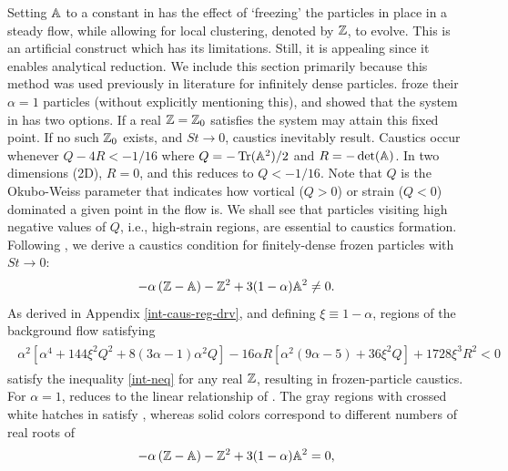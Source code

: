 \documentclass[../Rajarshi-thesis-draft.tex]{subfiles}
\begin{document}
Setting $\mathbb{A}$ to a constant in  has the effect of `freezing' the particles in place in a steady flow, while allowing for local clustering, denoted by $\mathbb{Z}$, to evolve. {This is an artificial construct which has its limitations. Still, it is appealing since it enables analytical reduction. We include this section primarily because this method was used previously in literature \cite{meibohm2021,meibohm2023,meibohm2024} for infinitely dense particles.} \citet{meibohm2021,meibohm2023} froze their $\alpha=1$ particles (without explicitly mentioning this), and showed that the system in  has two options. If a real $\mathbb{Z}=\mathbb{Z}_0$ satisfies  the system may attain this fixed point. If no such $\mathbb{Z}_0$  exists, and $St \to 0$, caustics inevitably result. Caustics occur whenever $Q - 4R < -1/16$ where $Q = -\operatorname{Tr}(\mathbb{A}^2)/2$ and $R = -\det(\mathbb{A})$. In two dimensions (2D), $R=0$, and this reduces to $Q < -1/16$. Note that $Q$ is the Okubo-Weiss parameter that indicates how vortical ($Q>0$) or strain ($Q<0$) dominated a given point in the flow is. We shall see that particles visiting high negative values of $Q$, i.e., high-strain regions, are essential to caustics formation. Following \cite{meibohm2021}, we derive a caustics condition for finitely-dense frozen particles with $St \to 0$:
\begin{align}
\label{int-neq}
\begin{split}
  -\alpha\left( \mathbb{Z}- \mathbb{A} \right) -\mathbb{Z}^2  + 3(1 - \alpha) \mathbb{A}^2 \neq 0.
\end{split}
\end{align}
As derived in Appendix \ref{int-caus-reg-drv}, and defining $\xi \equiv 1-\alpha$, regions of the background flow satisfying
\begin{align}
\label{int-caus_cond}
\begin{split}
  \alpha ^2 \left[\alpha ^4+144 \xi^2 Q^2+8 (3 \alpha -1) \alpha ^2 Q\right]-16 \alpha  R \left[\alpha ^2 (9 \alpha -5)+36 \xi^2 Q\right]
     + 1728 \xi^3 R^2 < 0
\end{split}
\end{align}
satisfy the inequality \eqref{int-neq} for any real $\mathbb{Z}$, resulting in frozen-particle caustics. For $\alpha = 1$,  reduces to the linear relationship of \cite{meibohm2023}.
The gray regions with crossed white hatches in  satisfy , whereas solid colors correspond to different numbers of real roots of
\begin{align}
  \label{int-root-eq}
\begin{split}
    -\alpha\left( \mathbb{Z}- \mathbb{A} \right) -\mathbb{Z}^2  + 3(1 - \alpha) \mathbb{A}^2 = 0,
\end{split}
\end{align}
\end{document}
